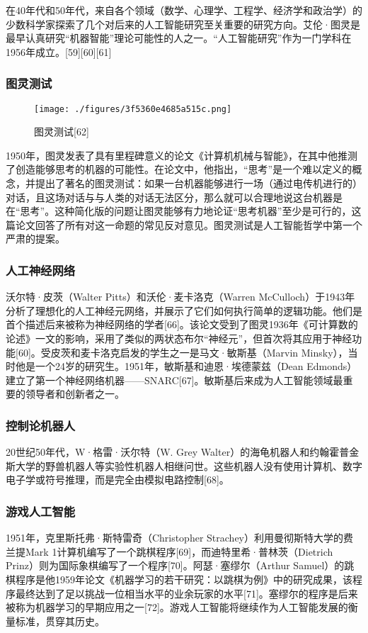 在40年代和50年代，来自各个领域（数学、心理学、工程学、经济学和政治学）的少数科学家探索了几个对后来的人工智能研究至关重要的研究方向。艾伦·图灵是最早认真研究“机器智能”理论可能性的人之一。“人工智能研究”作为一门学科在1956年成立。[59][60][61]
\subsubsection{图灵测试} 
\begin{figure}[ht]
\centering
\texttt{[image: ./figures/3f5360e4685a515c.png]}
\caption{图灵测试[62]} \label{fig_RGZN_6}
\end{figure}
1950年，图灵发表了具有里程碑意义的论文《计算机机械与智能》，在其中他推测了创造能够思考的机器的可能性。在论文中，他指出，“思考”是一个难以定义的概念，并提出了著名的图灵测试：如果一台机器能够进行一场（通过电传机进行的）对话，且这场对话与与人类的对话无法区分，那么就可以合理地说这台机器是在“思考”。这种简化版的问题让图灵能够有力地论证“思考机器”至少是可行的，这篇论文回答了所有对这一命题的常见反对意见。图灵测试是人工智能哲学中第一个严肃的提案。
\subsubsection{人工神经网络}  
沃尔特·皮茨（Walter Pitts）和沃伦·麦卡洛克（Warren McCulloch）于1943年分析了理想化的人工神经元网络，并展示了它们如何执行简单的逻辑功能。他们是首个描述后来被称为神经网络的学者[66]。该论文受到了图灵1936年《可计算数的论述》一文的影响，采用了类似的两状态布尔“神经元”，但首次将其应用于神经功能[60]。受皮茨和麦卡洛克启发的学生之一是马文·敏斯基（Marvin Minsky），当时他是一个24岁的研究生。1951年，敏斯基和迪恩·埃德蒙兹（Dean Edmonds）建立了第一个神经网络机器——SNARC[67]。敏斯基后来成为人工智能领域最重要的领导者和创新者之一。
\subsubsection{控制论机器人}  
20世纪50年代，W·格雷·沃尔特（W. Grey Walter）的海龟机器人和约翰霍普金斯大学的野兽机器人等实验性机器人相继问世。这些机器人没有使用计算机、数字电子学或符号推理，而是完全由模拟电路控制[68]。
\subsubsection{游戏人工智能}  
1951年，克里斯托弗·斯特雷奇（Christopher Strachey）利用曼彻斯特大学的费兰提Mark 1计算机编写了一个跳棋程序[69]，而迪特里希·普林茨（Dietrich Prinz）则为国际象棋编写了一个程序[70]。阿瑟·塞缪尔（Arthur Samuel）的跳棋程序是他1959年论文《机器学习的若干研究：以跳棋为例》中的研究成果，该程序最终达到了足以挑战一位相当水平的业余玩家的水平[71]。塞缪尔的程序是后来被称为机器学习的早期应用之一[72]。游戏人工智能将继续作为人工智能发展的衡量标准，贯穿其历史。
